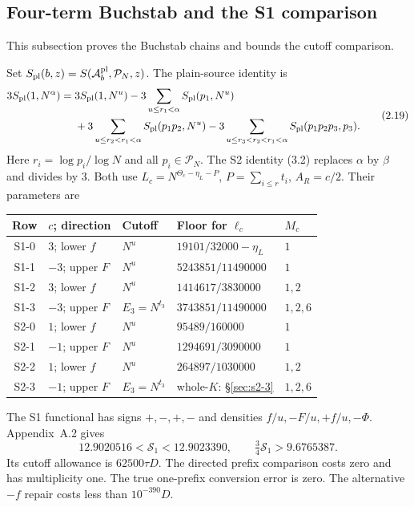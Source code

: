 \subsection{Four-term Buchstab and the S1 comparison}
\label{p2:sec:2.1}\label{p2:sec:2.2}
This subsection proves the Buchstab chains and bounds the cutoff comparison.
\begin{lemma}
Set $S_{\rm pl}(b,z)=S(\mathcal A_b^{\rm pl},\mathcal P_N,z)$.
The plain-source identity is
\[
\begin{aligned}
3S_{\rm pl}(1,N^\alpha)
={}&3S_{\rm pl}(1,N^u)
 -3\sum_{u\le r_1<\alpha}S_{\rm pl}(p_1,N^u)\\
&+3\sum_{u\le r_2<r_1<\alpha}S_{\rm pl}(p_1p_2,N^u)
 -3\sum_{u\le r_3<r_2<r_1<\alpha}S_{\rm pl}(p_1p_2p_3,p_3).
\end{aligned}\tag{2.19}\label{p2:eq:2.19}
\]
Here $r_i=\log p_i/\log N$ and all $p_i\in\mathcal P_N$.
The S2 identity (3.2) replaces $\alpha$ by $\beta$ and divides by $3$.
Both use $L_c=N^{\Theta_c-\eta_L-P}$, $P=\sum_{i\le r}t_i$, $A_R=c/2$.
Their parameters are
\begin{center}
\begin{tabular}{@{}cllll@{}}\toprule
Row & $c$; direction & Cutoff & Floor for $\ell_c$ & $M_c$\\\midrule
S1-0 & $3$; lower $f$ & $N^u$ & $19101/32000-\eta_L$ & $1$\\
S1-1 & $-3$; upper $F$ & $N^u$ & $5243851/11490000$ & $1$\\
S1-2 & $3$; lower $f$ & $N^u$ & $1414617/3830000$ & $1,2$\\
S1-3 & $-3$; upper $F$ & $E_3=N^{t_3}$ & $3743851/11490000$ & $1,2,6$\\
S2-0 & $1$; lower $f$ & $N^u$ & $95489/160000$ & $1$\\
S2-1 & $-1$; upper $F$ & $N^u$ & $1294691/3090000$ & $1$\\
S2-2 & $1$; lower $f$ & $N^u$ & $264897/1030000$ & $1,2$\\
S2-3 & $-1$; upper $F$ & $E_3=N^{t_3}$ & whole-$K$: \S\ref{sec:s2-3} & $1,2,6$\\\bottomrule
\end{tabular}
\end{center}
The S1 functional has signs $+,-,+,-$ and densities
$f/u,-F/u,+f/u,-\Phi$. Appendix~A.2 gives
\[
 12.9020516<\mathcal S_1<12.9023390,\qquad\tfrac34\mathcal S_1>9.6765387.
\]
Its cutoff allowance is $62500\tau D$.
The directed prefix comparison costs zero and has multiplicity one.
The true one-prefix conversion error is zero.
The alternative $-f$ repair costs less than $10^{-390}D$.
\end{lemma}
